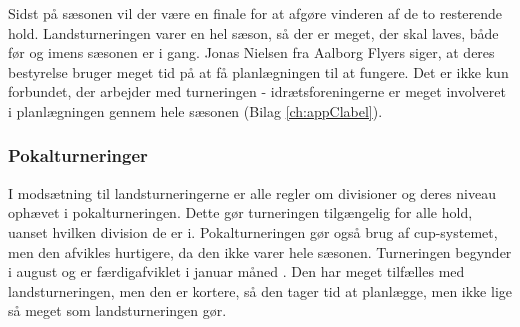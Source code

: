 Sidst på sæsonen vil der være en finale for at afgøre vinderen af de to resterende hold. Landsturneringen varer en hel sæson, så der er meget, der skal laves, både før og imens sæsonen er i gang. Jonas Nielsen fra Aalborg Flyers siger, at deres bestyrelse bruger meget tid på at få planlægningen til at fungere. Det er ikke kun forbundet, der arbejder med turneringen - idrætsforeningerne er meget involveret i planlægningen gennem hele sæsonen (Bilag \ref{ch:appClabel}). %

\subsubsection{Pokalturneringer}
I modsætning til landsturneringerne er alle regler om divisioner og deres niveau ophævet i pokalturneringen. Dette gør turneringen tilgængelig for alle hold, uanset hvilken division de er i. Pokalturneringen gør også brug af cup-systemet, men den afvikles hurtigere, da den ikke varer hele sæsonen. Turneringen begynder i august og er færdigafviklet i januar måned \cite{Pokalturnering}. Den har meget tilfælles med landsturneringen, men den er kortere, så den tager tid at planlægge, men ikke lige så meget som landsturneringen gør.

